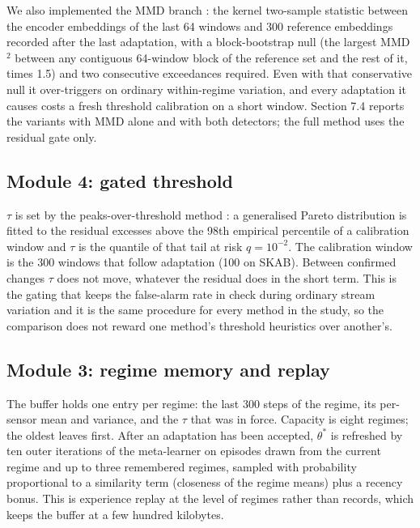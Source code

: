 We also implemented the MMD branch \citep{gretton2012mmd}: the kernel two-sample statistic between the encoder embeddings of the last 64 windows and 300 reference embeddings recorded after the last adaptation, with a block-bootstrap null (the largest MMD\ensuremath{^{2}} between any contiguous 64-window block of the reference set and the rest of it, times 1.5) and two consecutive exceedances required. Even with that conservative null it over-triggers on ordinary within-regime variation, and every adaptation it causes costs a fresh threshold calibration on a short window. Section 7.4 reports the variants with MMD alone and with both detectors; the full method uses the residual gate only.

\hypertarget{module-4-gated-threshold}{%
\subsection{Module 4: gated threshold}\label{module-4-gated-threshold}}

\(\tau\) is set by the peaks-over-threshold method \citep{siffer2017pot}: a generalised Pareto distribution is fitted to the residual excesses above the 98th empirical percentile of a calibration window and \(\tau\) is the quantile of that tail at risk \(q = 10^{-2}\). The calibration window is the 300 windows that follow adaptation (100 on SKAB). Between confirmed changes \(\tau\) does not move, whatever the residual does in the short term. This is the gating that keeps the false-alarm rate in check during ordinary stream variation and it is the same procedure for every method in the study, so the comparison does not reward one method's threshold heuristics over another's.

\hypertarget{module-3-regime-memory-and-replay}{%
\subsection{Module 3: regime memory and replay}\label{module-3-regime-memory-and-replay}}

The buffer holds one entry per regime: the last 300 steps of the regime, its per-sensor mean and variance, and the \(\tau\) that was in force. Capacity is eight regimes; the oldest leaves first. After an adaptation has been accepted, \(\theta^*\) is refreshed by ten outer iterations of the meta-learner on episodes drawn from the current regime and up to three remembered regimes, sampled with probability proportional to a similarity term (closeness of the regime means) plus a recency bonus. This is experience replay \citep{rolnick2019replay} at the level of regimes rather than records, which keeps the buffer at a few hundred kilobytes.


